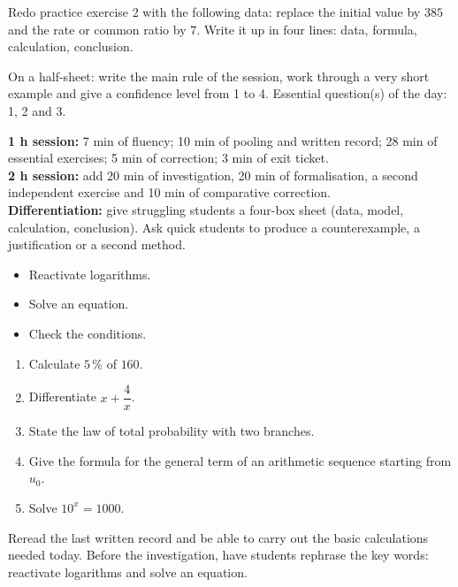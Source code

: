 \begin{dm}Redo practice exercise 2 with the following data: replace the initial value by $385$ and the rate or common ratio by $7$. Write it up in four lines: data, formula, calculation, conclusion.\end{dm}

\begin{sortie}On a half-sheet: write the main rule of the session, work through a very short example and give a confidence level from 1 to 4. Essential question(s) of the day: 1, 2 and 3.\end{sortie}

\ifprof
\begin{methode}
\textbf{1 h session:} 7 min of fluency; 10 min of pooling and written record; 28 min of essential exercises; 5 min of correction; 3 min of exit ticket.\\
\textbf{2 h session:} add 20 min of investigation, 20 min of formalisation, a second independent exercise and 10 min of comparative correction.\\
\textbf{Differentiation:} give struggling students a four-box sheet (data, model, calculation, conclusion). Ask quick students to produce a counterexample, a justification or a second method.
\end{methode}
\fi
{}
\begin{objectifs}\begin{itemize}\item Reactivate logarithms.\item Solve an equation.\item Check the conditions.\end{itemize}\end{objectifs}
\begin{automatismes}\begin{enumerate}\item Calculate $5\,\%$ of $160$. \item Differentiate $x+\dfrac4x$. \item State the law of total probability with two branches. \item Give the formula for the general term of an arithmetic sequence starting from $u_0$. \item Solve $10^x=1000$. \end{enumerate}\end{automatismes}
\begin{prerequis}Reread the last written record and be able to carry out the basic calculations needed today. Before the investigation, have students rephrase the key words: reactivate logarithms and solve an equation.\end{prerequis}

